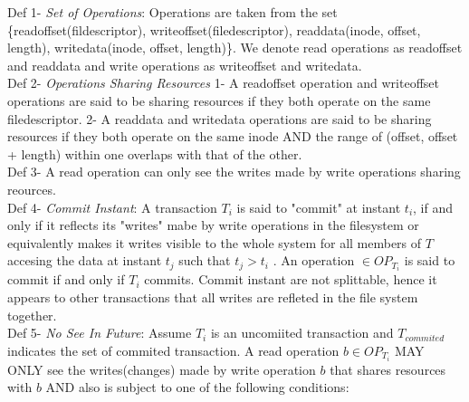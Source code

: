 \documentclass[a4paper, 11pt]{article}
\begin{document}
Def 1- \emph{Set of Operations}: Operations are taken from the set \{readoffset(fildescriptor), writeoffset(filedescriptor), readdata(inode, offset, length), writedata(inode, offset, length)\}. We denote read operations as readoffset and readdata and write operations as writeoffset and writedata.\\


Def 2- \emph{Operations Sharing Resources} 1- A readoffset operation and writeoffset operations are said to be sharing resources if they both operate on the same filedescriptor. 2- A readdata and writedata operations are said to be sharing resources if they both operate on the same inode AND the range of (offset, offset + length) within one overlaps with that of the other.\\ 

Def 3- A read operation can only see the writes made by write operations sharing reources.\\ 

Def 4- \emph{Commit Instant}: A transaction $T_i$ is said to "commit" at instant $t_i$, if and only if it reflects its "writes" mabe by write operations in the filesystem or equivalently makes it writes visible to the whole system for all members of $T$ accesing the data at instant $t_j$ such that $t_j > t_i$ . An operation $\in OP_{T_i}$ is said to commit if and only if $T_i$ commits. Commit instant are not splittable, hence it appears to other transactions that all writes are refleted in the file system together.\\ 

Def 5- \emph{No See In Future}: Assume $T_i$ is an uncomiited transaction and $T_{commited}$ indicates the set of commited transaction. A read operation $b \in OP_{T_i}$ MAY ONLY see the writes(changes) made by write operation $b$ that shares resources with $b$ AND also is subject to one of the following conditions:\\
\end{document}
